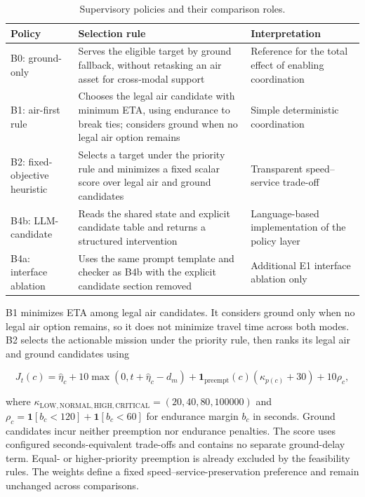 \documentclass[]{interact}
\theoremstyle{plain}
\theoremstyle{definition}
\theoremstyle{remark}
\begin{document}
\begin{table}[!htbp]
\centering
\small
\setlength{\tabcolsep}{3pt}
\caption{Supervisory policies and their comparison roles.}
\label{tab:table2}
\begin{tabularx}{\textwidth}{@{}YYY@{}}
\toprule
Policy & Selection rule & Interpretation \\
\midrule
B0: ground-only & Serves the eligible target by ground fallback, without retasking an air asset for cross-modal support & Reference for the total effect of enabling coordination \\
B1: air-first rule & Chooses the legal air candidate with minimum ETA, using endurance to break ties; considers ground when no legal air option remains & Simple deterministic coordination \\
B2: fixed-objective heuristic & Selects a target under the priority rule and minimizes a fixed scalar score over legal air and ground candidates & Transparent speed--service trade-off \\
B4b: LLM-candidate & Reads the shared state and explicit candidate table and returns a structured intervention & Language-based implementation of the policy layer \\
B4a: interface ablation & Uses the same prompt template and checker as B4b with the explicit candidate section removed & Additional E1 interface ablation only \\
\bottomrule
\end{tabularx}
\end{table}

B1 minimizes ETA among legal air candidates. It considers ground only when no legal air option remains, so it does not minimize travel time across both modes. B2 selects the actionable mission under the priority rule, then ranks its legal air and ground candidates using

\begin{equation*}
J_t(c)=\widehat\eta_c+10\max(0,t+\widehat\eta_c-d_m)
+\mathbf1_{\mathrm{preempt}}(c)(\kappa_{p(c)}+30)+10\rho_c, \tag{9}
\end{equation*}

where $\kappa_{\mathrm{LOW,NORMAL,HIGH,CRITICAL}}=(20,40,80,100000)$ and $\rho_c=\mathbf1[b_c<120]+\mathbf1[b_c<60]$ for endurance margin $b_c$ in seconds. Ground candidates incur neither preemption nor endurance penalties. The score uses configured seconds-equivalent trade-offs and contains no separate ground-delay term. Equal- or higher-priority preemption is already excluded by the feasibility rules. The weights define a fixed speed--service-preservation preference and remain unchanged across comparisons.
\end{document}
